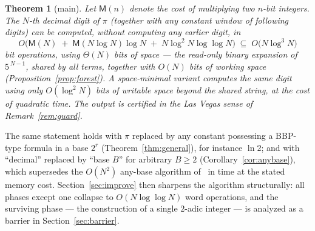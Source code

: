 \documentclass[11pt]{article}
\newtheorem{theorem}{Theorem}
\theoremstyle{remark}
\theoremstyle{definition}
\newcommand{\M}{\mathsf{M}}
\begin{document}
\begin{theorem}[main]\label{thm:main}
Let $\M(n)$ denote the cost of multiplying two $n$-bit integers. The $N$-th
decimal digit of $\pi$ (together with any constant window of following
digits) can be computed, without computing any earlier digit, in
\[
O\bigl(\M(N) \;+\; \M(N\log N)\log N \;+\; N\log^{2}N\log\log N\bigr)
\;\subseteq\; O\bigl(N\log^{3}N\bigr)
\]
bit operations, using $\Theta(N)$ bits of space --- the read-only binary
expansion of $5^{\,N-1}$, shared by all terms, together with $O(N)$ bits of
working space (Proposition~\ref{prop:forest}). A space-minimal variant computes
the same digit using only $O(\log^{2} N)$ bits of writable space beyond the
shared string, at the cost of quadratic time. The output is certified in the
Las Vegas sense of Remark~\ref{rem:guard}.
\end{theorem}

The same statement holds with $\pi$ replaced by any constant possessing a
BBP-type formula in a base $2^{r}$ (Theorem~\ref{thm:general}), for instance
$\ln 2$; and with ``decimal'' replaced by ``base $B$'' for arbitrary $B\ge 2$
(Corollary~\ref{cor:anybase}), which supersedes the $O(N^{2})$ any-base
algorithm of~\cite{Bellard97} in time at the stated memory cost.
Section~\ref{sec:improve} then sharpens the algorithm structurally: all
phases except one collapse to $O(N\log\log N)$ word operations, and the
surviving phase --- the construction of a single $2$-adic integer --- is
analyzed as a barrier in Section~\ref{sec:barrier}.
\end{document}
